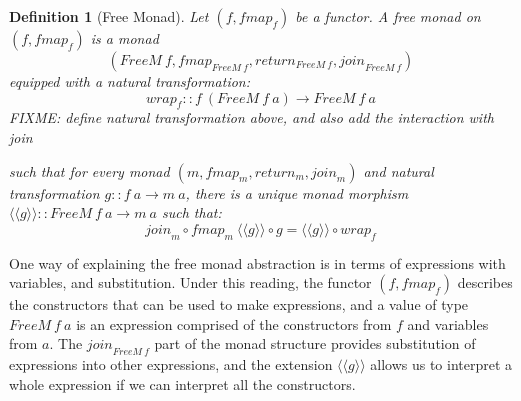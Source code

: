 \documentclass{jfp1}
\newcommand{\fmext}[1]{\langle\langle #1 \rangle\rangle}
\newtheorem{definition}{Definition}
\begin{document}
\begin{definition}[Free Monad]
  Let $(f, \mathit{fmap}_f)$ be a functor. A free monad on
  $(f,\mathit{fmap}_f)$ is a monad
  \begin{displaymath}
    (\mathit{FreeM}~f, \mathit{fmap}_{\mathit{FreeM}~f}, \mathit{return}_{\mathit{FreeM}~f}, \mathit{join}_{\mathit{FreeM}~f})
  \end{displaymath}
  equipped with a natural transformation:
  \begin{displaymath}
    \mathit{wrap}_f :: f~(\mathit{FreeM}~f~a) \to \mathit{FreeM}~f~a
  \end{displaymath}
  FIXME: define natural transformation above, and also add the interaction with join

  such that for every monad $(m,
  \mathit{fmap}_m, \mathit{return_m}, \mathit{join}_m)$ and natural
  transformation $g :: f~a \to m~a$, there is a unique monad morphism
  $\fmext{g} :: \mathit{FreeM}~f~a \to m~a$ such that:
  \begin{displaymath}
    \mathit{join}_m \circ \mathit{fmap}_m~\fmext{g} \circ g = \fmext{g} \circ \mathit{wrap}_f
  \end{displaymath}
\end{definition}

One way of explaining the free monad abstraction is in terms of
expressions with variables, and substitution. Under this reading, the
functor $(f,\mathit{fmap}_f)$ describes the constructors that can be
used to make expressions, and a value of type $\mathit{FreeM}~f~a$ is
an expression comprised of the constructors from $f$ and variables
from $a$. The $\mathit{join}_{\mathit{FreeM}~f}$ part of the monad
structure provides substitution of expressions into other expressions,
and the extension $\fmext{g}$ allows us to interpret a whole
expression if we can interpret all the constructors.
\end{document}
